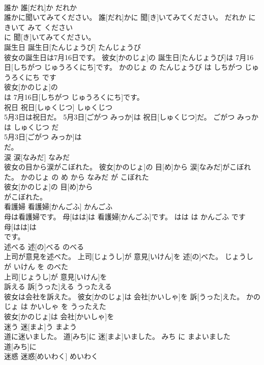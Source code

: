 \documentclass[8pt]{extreport}
\begin{document}
\begin{CJK}{UTF8}{min}
\\	誰か	誰[だれ]か	だれか	
\\	誰かに聞いてみてください。	誰[だれ]かに 聞[き]いてみてください。	だれか に きいて みて ください	
\\	に 聞[き]いてみてください。			
\\	誕生日	誕生日[たんじょうび]	たんじょうび	
\\	彼女の誕生日は7月16日です。	彼女[かのじょ]の 誕生日[たんじょうび]は 7月16日[しちがつ じゅうろくにち]です。	かのじょ の たんじょうび は しちがつ じゅうろくにち です	
\\	彼女[かのじょ]の
\\	は 7月16日[しちがつ じゅうろくにち]です。			
\\	祝日	祝日[しゅくじつ]	しゅくじつ	
\\	5月3日は祝日だ。	5月3日[ごがつ みっか]は 祝日[しゅくじつ]だ。	ごがつ みっか は しゅくじつ だ	
\\	5月3日[ごがつ みっか]は
\\	だ。			
\\	涙	涙[なみだ]	なみだ	
\\	彼女の目から涙がこぼれた。	彼女[かのじょ]の 目[め]から 涙[なみだ]がこぼれた。	かのじょ の め から なみだ が こぼれた	
\\	彼女[かのじょ]の 目[め]から
\\	がこぼれた。			
\\	看護婦	看護婦[かんごふ]	かんごふ	
\\	母は看護婦です。	母[はは]は 看護婦[かんごふ]です。	はは は かんごふ です	
\\	母[はは]は
\\	です。			
\\	述べる	述[の]べる	のべる	
\\	上司が意見を述べた。	上司[じょうし]が 意見[いけん]を 述[の]べた。	じょうし が いけん を のべた	
\\	上司[じょうし]が 意見[いけん]を
\\	訴える	訴[うった]える	うったえる	
\\	彼女は会社を訴えた。	彼女[かのじょ]は 会社[かいしゃ]を 訴[うった]えた。	かのじょ は かいしゃ を うったえた	
\\	彼女[かのじょ]は 会社[かいしゃ]を
\\	迷う	迷[まよ]う	まよう	
\\	道に迷いました。	道[みち]に 迷[まよ]いました。	みち に まよいました	
\\	道[みち]に
\\	迷惑	迷惑[めいわく]	めいわく	

\end{CJK}
\end{document}
